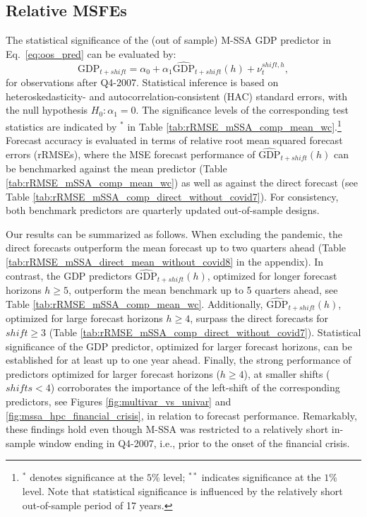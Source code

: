 \documentclass[11pt,a4paper]{article}
\begin{document}
\subsection*{Relative MSFEs}\label{sec:oosp}

The statistical significance of the (out of sample) M-SSA GDP predictor in Eq.~\eqref{eq:oos_pred} can be evaluated by:
\begin{equation}\label{eq:eq_gdp_pred}
\textrm{GDP}_{t+shift}=\alpha_0+\alpha_1\widehat{\textrm{GDP}}_{t+shift}(h)+\nu_{t}^{shift,h},
\end{equation}
for observations after Q4-2007. Statistical inference is based on heteroskedasticity- and autocorrelation-consistent (HAC) standard errors, with the null hypothesis $H_0 : \alpha_1 =0$. The significance levels of the corresponding test statistics are indicated by $^{*}$ in Table \ref{tab:rRMSE_mSSA_comp_mean_wc}.\footnote{$^{*}$ denotes significance at the $5\%$ level; $^{**}$ indicates significance at the $1\%$ level. Note that statistical significance is influenced by the relatively short out-of-sample period of 17 years.} Forecast accuracy is evaluated in terms of relative root mean squared forecast errors (rRMSEs), where the MSE forecast performance of $\widehat{\textrm{GDP}}_{t+shift}(h)$ can be benchmarked against the mean predictor (Table \ref{tab:rRMSE_mSSA_comp_mean_wc}) as well as against the direct forecast (see Table \ref{tab:rRMSE_mSSA_comp_direct_without_covid7}). For consistency, both benchmark predictors are quarterly updated out-of-sample designs.

Our results can be summarized as follows. When excluding the pandemic, the direct forecasts outperform the mean forecast up to two quarters ahead (Table \ref{tab:rRMSE_mSSA_direct_mean_without_covid8} in the appendix). %
In contrast, the GDP predictors $\widehat{\textrm{GDP}}_{t+shift}(h)$, optimized for longer forecast horizons $h\geq 5$, outperform the mean benchmark up to 5 quarters ahead, see Table \ref{tab:rRMSE_mSSA_comp_mean_wc}. Additionally, $\widehat{\textrm{GDP}}_{t+shift}(h)$, optimized for large forecast horizons $h\geq 4$, surpass the direct forecasts for $shift\geq 3$ (Table \ref{tab:rRMSE_mSSA_comp_direct_without_covid7}). Statistical significance of the GDP predictor, optimized for larger forecast horizons, can be established for at least up to one year ahead. Finally, the strong performance of predictors optimized for larger forecast horizons ($h\geq 4$), at smaller shifts ($shifts< 4$) corroborates the importance of the left-shift of the corresponding predictors, see Figures \ref{fig:multivar_vs_univar} and \ref{fig:mssa_hpc_financial_crisis}, in relation to forecast performance. Remarkably, these findings hold even though M-SSA was restricted to a relatively short in-sample window ending in Q4-2007, i.e., prior to the onset of the financial crisis.
\end{document}
